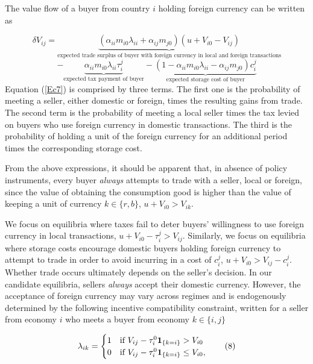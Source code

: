 The value flow of a buyer from country $i$ holding foreign currency can be written as

\[
    \delta V_{ij}  =  \underbrace{(\alpha_{ii}m_{i0}\lambda_{ii}+\alpha_{ij}m_{j0})(u+ V_{i0}-V_{ij})}_\text{expected trade surplus of buyer with foreign currency in local and foreign transactions} \tag{7} \label{Ec7}
\]
\[
    - \underbrace{\alpha_{ii}m_{i0}\lambda_{ii}\tau^{j}_{i}}_\text{expected tax payment of buyer} - \underbrace{(1- \alpha_{ii}m_{i0}\lambda_{ii}-\alpha_{ij}m_{j0})c^j_i }_\text{expected storage cost of buyer}
\]
Equation (\ref{Ec7}) is comprised by three terms. The first one is the probability of meeting a seller, either domestic or foreign, times the resulting gains from trade. The second term is the probability of meeting a local seller times the tax levied on buyers who use foreign currency in domestic transactions. The third is the probability of holding a unit of the foreign currency for an additional period times the corresponding storage cost.

From the above expressions, it should be apparent that, in absence of policy instruments, every buyer \textit{always} attempts to trade with a seller, local or foreign, since the value of obtaining the consumption good is higher than the value of keeping a unit of currency $k\in\{r,b\}$, $u+V_{i0}>V_{ik}$. 

We focus on equilibria where taxes fail to deter buyers' willingness to use foreign currency in local transactions, $u+V_{i0}-\tau_{i}^{j}>V_{ij}$. Similarly, we focus on equilibria where storage costs encourage domestic buyers holding foreign currency to attempt to trade in order to avoid incurring in a cost of $c_i^j$, $u+V_{i0}>V_{ij}-c_i^j$. Whether trade occurs ultimately depends on the seller's decision. In our candidate equilibria, sellers \textit{always} accept their domestic currency. However, the acceptance of foreign currency may vary across regimes and is endogenously determined by the following incentive compatibility constraint, written for a seller from economy $i$ who meets a buyer from economy $k\in\{i,j\}$

\begin{equation}
    \lambda_{ik} = 
    \begin{cases}                                  
    1    & $if $ V_{ij} - \tau^{0}_{i}\textbf{1}_{\{k=i\}} > V_{i0} \\
    0    & $if $ V_{ij} - \tau^{0}_{i}\textbf{1}_{\{k=i\}} \leq V_{i0},
    \end{cases}
    \tag{8} \label{Ec8}
\end{equation}


